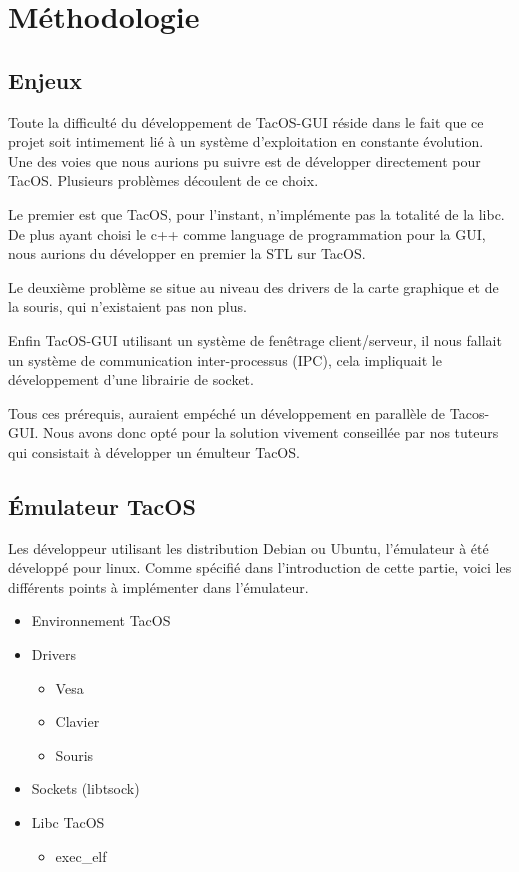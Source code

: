 \section{Méthodologie}

\subsection{Enjeux}

Toute la difficulté du développement de TacOS-GUI réside dans le fait que ce projet soit intimement lié à un système d'exploitation en constante évolution.
Une des voies que nous aurions pu suivre est de développer directement pour TacOS.
Plusieurs problèmes découlent de ce choix.

Le premier est que TacOS, pour l'instant, n'implémente pas la totalité de la libc.
De plus ayant choisi le c++ comme language de programmation pour la GUI, nous aurions du développer en premier la STL sur TacOS.

Le deuxième problème se situe au niveau des drivers de la carte graphique et de la souris, qui n'existaient pas non plus.

Enfin TacOS-GUI utilisant un système de fenêtrage client/serveur, il nous fallait un système de communication inter-processus (IPC), cela impliquait le développement d'une librairie de socket.

Tous ces prérequis, auraient empéché un développement en parallèle de Tacos-GUI.
Nous avons donc opté pour la solution vivement conseillée par nos tuteurs qui consistait à développer un émulteur TacOS.

\subsection{Émulateur TacOS}

Les développeur utilisant les distribution Debian ou Ubuntu, l'émulateur à été développé pour linux.
Comme spécifié dans l'introduction de cette partie, voici les différents points à implémenter dans l'émulateur.

\begin{itemize}
  \item Environnement TacOS
  \item Drivers
  \begin{itemize}
    \item Vesa
    \item Clavier
    \item Souris 
  \end{itemize}
  \item Sockets (libtsock)
  \item Libc TacOS
  \begin{itemize}
    \item exec\_elf
  \end{itemize}
\end{itemize}

